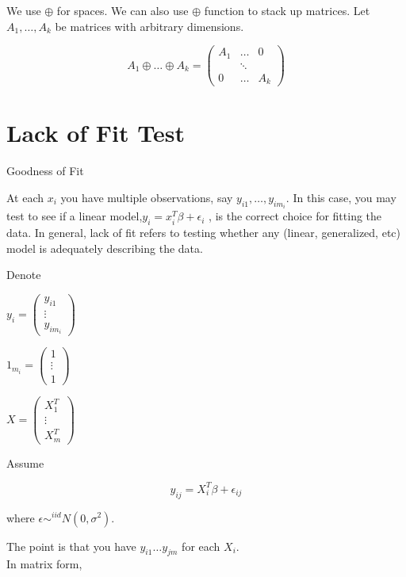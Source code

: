 \documentclass[11pt,fleqn]{book} %
\begin{document}
\begin{notation}
	We use $\oplus$ for spaces. We can also use $\oplus$ function to stack up matrices. Let $A_1, \dots, A_k$ be matrices with arbitrary dimensions. 

	$$A_1 \oplus \dots \oplus A_k = \begin{pmatrix}
		A_1 & \dots & 0\\
		    & \ddots & \\
		0 & \dots & A_k
	\end{pmatrix} $$
\end{notation}

\section{Lack of Fit Test}

Goodness of Fit


At each $x_i$ you have multiple observations, say $y_{i1}, \dots, y_{im_i}$. In this case, you may test to see if a linear model,$y_i = x_i^T \beta + \epsilon_i$ , is the correct choice for fitting the data. In general, lack of fit refers to testing whether any (linear, generalized, etc) model is adequately describing the data. 

Denote 

$y_i = \begin{pmatrix}
	y_{i1}\\
	\vdots\\
	y_{im_i}
\end{pmatrix}$

$1_{m_i} = \begin{pmatrix}
	1 \\
	\vdots\\
	1
\end{pmatrix}$

$X = \begin{pmatrix}
	X_{1}^T\\
	\vdots\\
	X_{m}^T
\end{pmatrix}$

Assume

$$y_{ij} = X_i^T \beta + \epsilon_{ij} $$

where $\epsilon \sim^{iid} N(0, \sigma^2)$. 

The point is that you have $y_{i1} \dots y_{jm}$ for each $X_i$.\\

In matrix form, 
\end{document}
